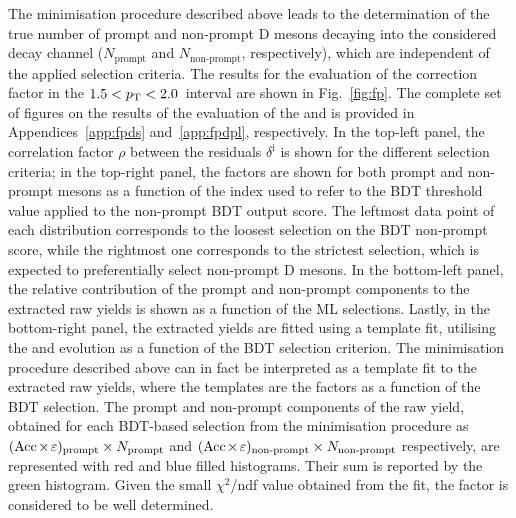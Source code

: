 The minimisation procedure described above leads to the determination of the true number of prompt and non-prompt D mesons decaying into the considered decay channel ($N_\mathrm{prompt}$ and $N_\mathrm{non\text{-}prompt}$, respectively), which are independent of the applied selection criteria. The results for the evaluation of the \ds \fp correction factor in the $1.5<p_\mathrm{T}<2.0$~\gevc interval are shown in Fig.~\ref{fig:fp}. The complete set of figures on the results of the evaluation of the \fpds and \fpdpl is provided in Appendices~\ref{app:fpds} and~\ref{app:fpdpl}, respectively. In the top-left panel, the correlation factor $\rho$ between the residuals $\delta^\mathrm{i}$ is shown for the different selection criteria; in the top-right panel, the \aeff factors are shown for both prompt and non-prompt \ds mesons as a function of the index used to refer to the BDT threshold value applied to the non-prompt BDT output score. The leftmost data point of each distribution corresponds to the loosest selection on the BDT non-prompt score, while the rightmost one corresponds to the strictest selection, which is expected to preferentially select non-prompt D mesons. In the bottom-left panel, the relative contribution of the prompt and non-prompt components to the extracted \ds raw yields is shown as a function of the ML selections. Lastly, in the bottom-right panel, the extracted yields are fitted using a template fit, utilising the \aeffpds and \aeffnpds evolution as a function of the BDT selection criterion. The minimisation procedure described above can in fact be interpreted as a template fit to the extracted raw yields, where the templates are the \aeff factors as a function of the BDT selection. The prompt and non-prompt components of the raw yield, obtained for each BDT-based selection from the minimisation procedure as \mbox{$(\mathrm{Acc}\mkern-2mu\times\mkern-2mu\varepsilon)_\mathrm{prompt}\times N_\mathrm{prompt}$} and $(\mathrm{Acc}\mkern-2mu\times\mkern-2mu\varepsilon)_\mathrm{non\text{-}prompt}\times N_\mathrm{non\text{-}prompt}$ respectively, are represented with red and blue filled histograms. Their sum is reported by the green histogram. Given the small $\chi^2$/ndf value obtained from the fit, the \fp factor is considered to be well determined. 
